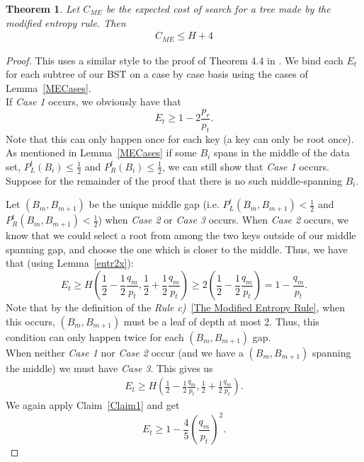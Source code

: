 \documentclass[letterpaper,12pt,titlepage,oneside,final]{book}
\theoremstyle{plain}
\newtheorem{thm}{Theorem}[section]
\begin{document}
\begin{thm}
Let $C_{ME}$ be the expected cost of search for a tree made by the modified entropy rule. Then
\begin{align*}
C_{ME} \leq H + 4
\end{align*}
\end{thm}

\begin{proof}
This uses a similar style to the proof of Theorem 4.4 in \cite{bayer1975improved}.
We bind each $E_t$ for each subtree of our BST on a case by case basis using the cases of Lemma~\ref{MECases}.\\
If \textit{Case 1} occurs, we obviously have that
\begin{equation}\label{EQC1}
E_t \geq 1-2 \frac{p_r}{p_t}.
\end{equation}
Note that this can only happen once for each key (a key can only be root once). \\

As mentioned in Lemma~\ref{MECases} if some $B_i$ spans in the middle of the data set, $P^t_L(B_i) \leq \frac{1}{2}$ and $P^t_R(B_i) \leq \frac{1}{2}$, we can still show that \textit{Case 1} occurs. Suppose for the remainder of the proof that there is no such middle-spanning $B_i$.

Let $(B_m, B_{m+1})$ be the unique middle gap (i.e. $P^t_L(B_m, B_{m+1}) < \frac{1}{2}$ and $P^t_R(B_m, B_{m+1}) < \frac{1}{2}$) when \textit{Case 2} or \textit{Case 3} occurs. When \textit{Case 2} occurs, we know that we could select a root from among the two keys outside of our middle spanning gap, and choose the one which is closer to the middle. Thus, we have that (using Lemma~\ref{entr2x}):
\begin{equation}\label{EQC2} 
E_t \geq H(\frac{1}{2}-\frac{1}{2} \frac{q_m}{p_t}, \frac{1}{2} + \frac{1}{2} \frac{q_m}{p_t}) \geq 2(\frac{1}{2}-\frac{1}{2} \frac{q_m}{p_t})=1-\frac{q_m}{p_t}.
\end{equation}
Note that by the definition of the \textit{Rule c)}~\ref{The Modified Entropy Rule}, when this occurs, $(B_m, B_{m+1})$ must be a leaf of depth at most 2. Thus, this condition can only happen twice for each $(B_m, B_{m+1})$ gap. \\

When neither \textit{Case 1} nor \textit{Case 2} occur (and we have a $(B_m, B_{m+1})$ spanning the middle) we must have \textit{Case 3}. This gives us
\begin{align*}
E_t \geq H(\frac{1}{2}-\frac{1}{2} \frac{q_m}{p_t}, \frac{1}{2} + \frac{1}{2} \frac{q_m}{p_t}).
\end{align*}
We again apply Claim~\ref{Claim1} and get
\begin{equation}\label{EQC3}
E_t \geq 1- \frac{4}{5} (\frac{q_m}{p_t})^2.
\end{equation}


\end{proof}
\end{document}
